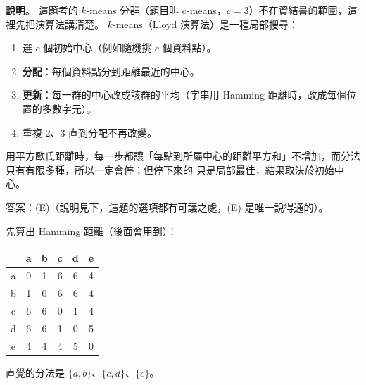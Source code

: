 \begin{pastsoln}
\textbf{說明}。 這題考的 $k$-means 分群（題目叫 c-means，$c = 3$）不在資結書的範圍，這裡先把演算法講清楚。
$k$-means（Lloyd 演算法）是一種局部搜尋：
\begin{enumerate}
\item 選 $c$ 個初始中心（例如隨機挑 $c$ 個資料點）。
\item \textbf{分配}：每個資料點分到距離最近的中心。
\item \textbf{更新}：每一群的中心改成該群的平均（字串用 Hamming 距離時，改成每個位置的多數字元）。
\item 重複 2、3 直到分配不再改變。
\end{enumerate}
用平方歐氏距離時，每一步都讓「每點到所屬中心的距離平方和」不增加，而分法只有有限多種，所以一定會停；但停下來的
只是局部最佳，結果取決於初始中心。

答案：(E)（說明見下，這題的選項都有可議之處，(E) 是唯一說得通的）。

先算出 Hamming 距離（後面會用到）：
\begin{center}
\begin{tabular}{c|ccccc}
 & a & b & c & d & e \\ \hline
a & 0 & 1 & 6 & 6 & 4 \\
b & 1 & 0 & 6 & 6 & 4 \\
c & 6 & 6 & 0 & 1 & 4 \\
d & 6 & 6 & 1 & 0 & 5 \\
e & 4 & 4 & 4 & 5 & 0
\end{tabular}
\end{center}
直覺的分法是 $\{a, b\}$、$\{c, d\}$、$\{e\}$。


\end{pastsoln}
